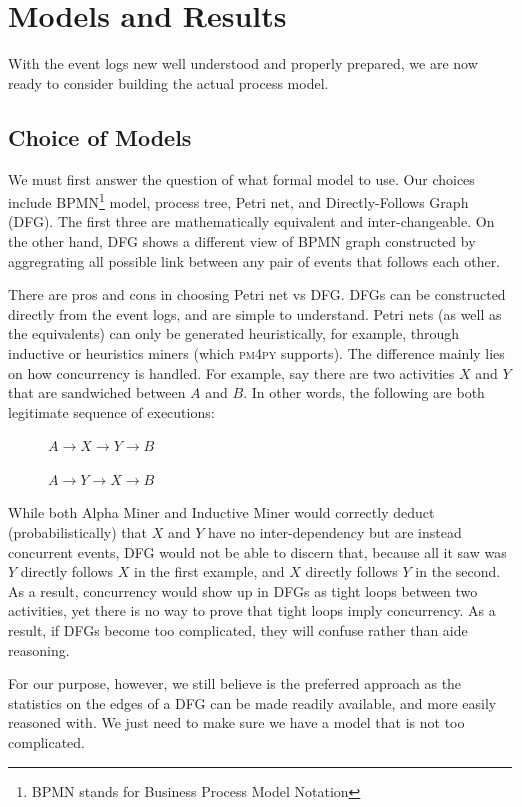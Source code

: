 \documentclass[conference]{IEEEtran}
\begin{document}
\section{Models and Results}
\label{section-models}


With the event logs new well understood and properly prepared, we are now
ready to consider building the actual process model.

\subsection{Choice of Models}

We must first answer the
question of what formal model to use. Our choices include BPMN\footnote{BPMN stands for Business Process Model Notation}  model,
process tree, Petri net, and Directly-Follows Graph (DFG). The
first three are mathematically equivalent and inter-changeable. On the other
hand, DFG shows a different view of BPMN graph constructed by aggregrating all possible link
between any pair of events that follows each other.

There are pros and cons in choosing Petri net vs DFG. DFGs can be constructed
directly from the event logs, and are simple to understand. Petri nets (as well
as the equivalents) can only be generated heuristically, for example, 
through inductive or heuristics miners (which \textsc{pm4py} supports).
The difference mainly lies on how concurrency is handled. For example,
say there are two activities $X$ and $Y$ that are sandwiched between
$A$ and $B$. In other words, the following are both legitimate sequence
of executions:

$\phantom{xxxxx}A \rightarrow X \rightarrow Y \rightarrow B$

$\phantom{xxxxx}A \rightarrow Y \rightarrow X \rightarrow B$


While both Alpha Miner and Inductive Miner would correctly deduct
(probabilistically) that $X$ and $Y$ have no inter-dependency but are
instead concurrent events, DFG would not be able to discern that, because
all it saw was $Y$ directly follows $X$ in the first example, and
$X$ directly follows $Y$ in the second. As a result, concurrency would
show up in DFGs as tight loops between two activities, yet there is no
way to prove that tight loops imply concurrency. As a result, if DFGs
become too complicated, they will confuse rather than aide reasoning.

For our purpose, however, we still believe 
is the preferred approach as the statistics on the edges of a DFG can be
made readily available, and more easily reasoned with. We just need to make
sure we have a model that is not too complicated.
\end{document}

